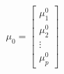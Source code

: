 

\[
\mu_{0} =
\left[
\begin{array}{c}
\mu_{1}^{0} \\
\mu_{2}^{0} \\
\vdots \\
\mu_{p}^{0}
\end{array}
\right]
\]


